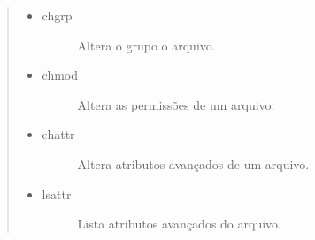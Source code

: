 \documentclass[a4paper,10pt,brazil]{sphinxmanual}
\begin{document}
\begin{quote}
\begin{itemize}
\item {} \begin{description}
\item[{chgrp}] \leavevmode
Altera o grupo o arquivo.

\end{description}

\item {} \begin{description}
\item[{chmod}] \leavevmode
Altera as permissões de um arquivo.

\end{description}

\item {} \begin{description}
\item[{chattr}] \leavevmode
Altera atributos avançados de um arquivo.

\end{description}

\item {} \begin{description}
\item[{lsattr}] \leavevmode
Lista atributos avançados do arquivo.

\end{description}

\end{itemize}
\end{quote}
\end{document}
